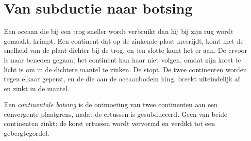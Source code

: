 \section{Van subductie naar botsing}

Een oceaan die bij een trog sneller wordt verbruikt dan hij bij zijn rug wordt gemaakt,
krimpt. Een continent dat op de zinkende plaat meerijdt, komt met de snelheid van de
plaat dichter bij de trog, en ten slotte komt het er aan. De  ervoor is naar beneden gegaan; het continent kan haar niet volgen,
omdat zijn korst te licht is om in de dichtere mantel te zinken. De 
stopt. De twee continenten worden tegen elkaar geperst, en de 
die aan de oceaanbodem hing, breekt uiteindelijk af en zinkt in de
mantel.

\begin{definition}\label{def:g12:mountain-building:collision}
Een \emph{continentale botsing} is de ontmoeting van
twee continenten aan een convergente plaatgrens, nadat de 
ertussen is gesubduceerd. Geen van beide continenten zinkt: de korst ertussen
wordt vervormd en verdikt tot een gebergtegordel.
\end{definition}

